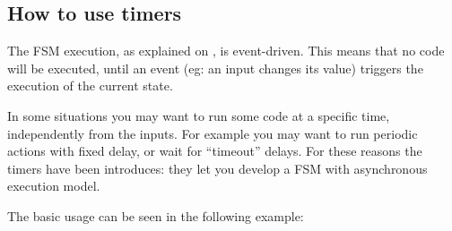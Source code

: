 \documentclass[letterpaper,10pt,english]{sphinxmanual}
\begin{document}
\subsection{How to use timers}
\label{\detokenize{timer:how-to-use-timers}}
The FSM execution, as explained on {\hyperref[\detokenize{fsm:fsm-development}]{}}, is event-driven. This
means that no code will be executed, until an event (eg: an input changes its
value) triggers the execution of the current state.

In some situations you may want to run some code at a specific time,
independently from the inputs. For example you may want to run periodic actions
with fixed delay, or wait for “timeout” delays. For these reasons the timers
have been introduces: they let you develop a FSM with asynchronous execution
model.

The basic usage can be seen in the following example:

%
\begin{sphinxVerbatim}[commandchars=\\\{\}]
 
                         
               

 
                 
                 
             
                     
\end{sphinxVerbatim}
\end{document}
